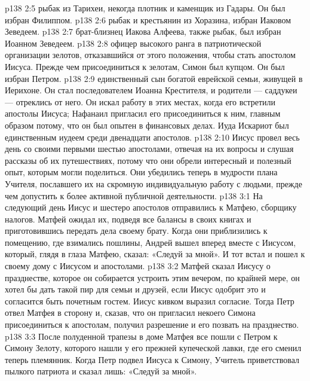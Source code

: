\vs p138 2:5 \pc {}\bibnobreakspace {} рыбак из Тарихеи, некогда плотник и каменщик из Гадары. Он был избран Филиппом.
\vs p138 2:6 \pc {}\bibnobreakspace {} рыбак и крестьянин из Хоразина, избран Иаковом Зеведеем.
\vs p138 2:7 \pc {}\bibnobreakspace {} брат\hyp{}близнец Иакова Алфеева, также рыбак, был избран Иоанном Зеведеем.
\vs p138 2:8 \pc {}\bibnobreakspace {} офицер высокого ранга в патриотической организации зелотов, отказавшийся от этого положения, чтобы стать апостолом Иисуса. Прежде чем присоединиться к зелотам, Симон был купцом. Он был избран Петром.
\vs p138 2:9 \pc {}\bibnobreakspace {} единственный сын богатой еврейской семьи, живущей в Иерихоне. Он стал последователем Иоанна Крестителя, и родители --- саддукеи --- отреклись от него. Он искал работу в этих местах, когда его встретили апостолы Иисуса; Нафанаил пригласил его присоединиться к ним, главным образом потому, что он был опытен в финансовых делах. Иуда Искариот был единственным иудеем среди двенадцати апостолов.
\vs p138 2:10 \pc Иисус провел весь день со своими первыми шестью апостолами, отвечая на их вопросы и слушая рассказы об их путешествиях, потому что они обрели интересный и полезный опыт, которым могли поделиться. Они убедились теперь в мудрости плана Учителя, пославшего их на скромную индивидуальную работу с людьми, прежде чем допустить к более активной публичной деятельности.
\vs p138 3:1 На следующий день Иисус и шестеро апостолов отправились к Матфею, сборщику налогов. Матфей ожидал их, подведя все балансы в своих книгах и приготовившись передать дела своему брату. Когда они приблизились к помещению, где взимались пошлины, Андрей вышел вперед вместе с Иисусом, который, глядя в глаза Матфею, сказал: «Следуй за мной». И тот встал и пошел к своему дому с Иисусом и апостолами.
\vs p138 3:2 Матфей сказал Иисусу о празднестве, которое он собирается устроить этим вечером, по крайней мере, он хотел бы дать такой пир для семьи и друзей, если Иисус одобрит это и согласится быть почетным гостем. Иисус кивком выразил согласие. Тогда Петр отвел Матфея в сторону и, сказав, что он пригласил некоего Симона присоединиться к апостолам, получил разрешение и его позвать на празднество.
\vs p138 3:3 \pc После полуденной трапезы в доме Матфея все пошли с Петром к Симону Зелоту, которого нашли у его прежней купеческой лавки, где его сменил теперь племянник. Когда Петр подвел Иисуса к Симону, Учитель приветствовал пылкого патриота и сказал лишь: «Следуй за мной».
